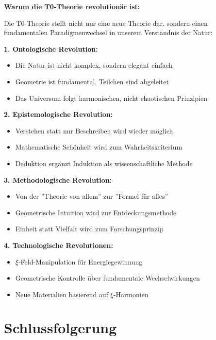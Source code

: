 \documentclass[12pt,a4paper]{article}
\begin{document}
	\begin{foundation}
		\textbf{Warum die T0-Theorie revolutionär ist:}
		
		Die T0-Theorie stellt nicht nur eine neue Theorie dar, sondern einen fundamentalen Paradigmenwechsel in unserem Verständnis der Natur:
		
		\textbf{1. Ontologische Revolution:}
		\begin{itemize}
			\item Die Natur ist nicht komplex, sondern elegant einfach
			\item Geometrie ist fundamental, Teilchen sind abgeleitet
			\item Das Universum folgt harmonischen, nicht chaotischen Prinzipien
		\end{itemize}
		
		\textbf{2. Epistemologische Revolution:}
		\begin{itemize}
			\item Verstehen statt nur Beschreiben wird wieder möglich
			\item Mathematische Schönheit wird zum Wahrheitskriterium
			\item Deduktion ergänzt Induktion als wissenschaftliche Methode
		\end{itemize}
		
		\textbf{3. Methodologische Revolution:}
		\begin{itemize}
			\item Von der ''Theorie von allem'' zur ''Formel für alles''
			\item Geometrische Intuition wird zur Entdeckungsmethode
			\item Einheit statt Vielfalt wird zum Forschungsprinzip
		\end{itemize}
		
		\textbf{4. Technologische Revolutionen:}
		\begin{itemize}
			\item $\xi$-Feld-Manipulation für Energiegewinnung
			\item Geometrische Kontrolle über fundamentale Wechselwirkungen
			\item Neue Materialien basierend auf $\xi$-Harmonien
		\end{itemize}
	\end{foundation}
	
	\section{Schlussfolgerung}
	
\end{document}
